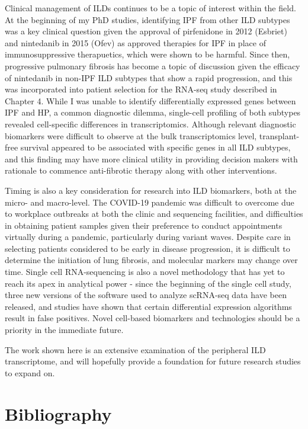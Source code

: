 \documentclass[
]{article}
\begin{document}
Clinical management of ILDs continues to be a topic of interest within the field. At the beginning of my PhD studies, identifying IPF from other ILD subtypes was a key clinical question given the approval of pirfenidone in 2012 (Esbriet\textregistered) and nintedanib in 2015 (Ofev\textregistered) as approved therapies for IPF in place of immunosuppressive therapuetics, which were shown to be harmful. Since then, progressive pulmonary fibrosis has become a topic of discussion given the efficacy of nintedanib in non-IPF ILD subtypes that show a rapid progression, and this was incorporated into patient selection for the RNA-seq study described in Chapter 4. While I was unable to identify differentially expressed genes between IPF and HP, a common diagnostic dilemma, single-cell profiling of both subtypes revealed cell-specific differences in transcriptomics. Although relevant diagnostic biomarkers were difficult to observe at the bulk transcriptomics level, transplant-free survival appeared to be associated with specific genes in all ILD subtypes, and this finding may have more clinical utility in providing decision makers with rationale to commence anti-fibrotic therapy along with other interventions.

Timing is also a key consideration for research into ILD biomarkers, both at the micro- and macro-level. The COVID-19 pandemic was difficult to overcome due to workplace outbreaks at both the clinic and sequencing facilities, and difficulties in obtaining patient samples given their preference to conduct appointments virtually during a pandemic, particularly during variant waves. Despite care in selecting patients considered to be early in disease progression, it is difficult to determine the initiation of lung fibrosis, and molecular markers may change over time. Single cell RNA-sequencing is also a novel methodology that has yet to reach its apex in analytical power - since the beginning of the single cell study, three new versions of the software used to analyze scRNA-seq data have been released, and studies have shown that certain differential expression algorithms result in false positives. Novel cell-based biomarkers and technologies should be a priority in the immediate future.

The work shown here is an extensive examination of the peripheral ILD transcriptome, and will hopefully provide a foundation for future research studies to expand on.

\clearpage

\section*{Bibliography}
\end{document}
